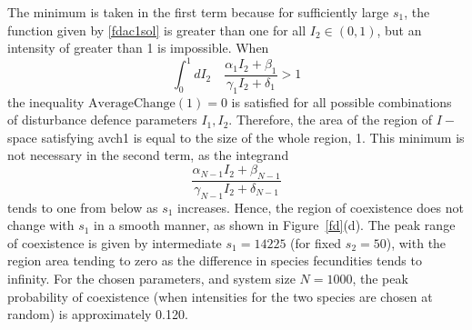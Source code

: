 The minimum is taken in the first term because for sufficiently large $s_1$, the function given by \eqref{fdac1sol} is greater than one for all $I_2 \in (0,1)$, but an intensity of greater than 1 is impossible. When
\begin{equation}
\label{fdto:lbint}
\int_0^1 dI_2 \quad \frac{\alpha_1 I_2 +\beta_1}{\gamma_1 I_2+\delta_1} >1
\end{equation}
the inequality $\text{AverageChange}(1)=0$ is satisfied for all possible combinations of disturbance defence parameters $I_1,I_2$. Therefore, the area of the region of $I-$space satisfying {avch1} is equal to the size of the whole region, 1. This minimum is not necessary in the second term, as the integrand
$$
\frac{\alpha_{N-1} I_2 +\beta_{N-1}}{\gamma_{N-1} I_2+\delta_{N-1}}
$$
tends to one from below as $s_1$ increases.
 Hence, the region of coexistence does not change with $s_1$ in a smooth manner, as shown in Figure~\ref{fd}(d). The peak range of coexistence is given by intermediate $s_1=14225$ (for fixed $s_2=50$), with the region area tending to zero as the difference in species fecundities tends to infinity. For the chosen parameters, and system size $N=1000$, the peak probability of coexistence (when intensities for the two species are chosen at random) is approximately 0.120.
